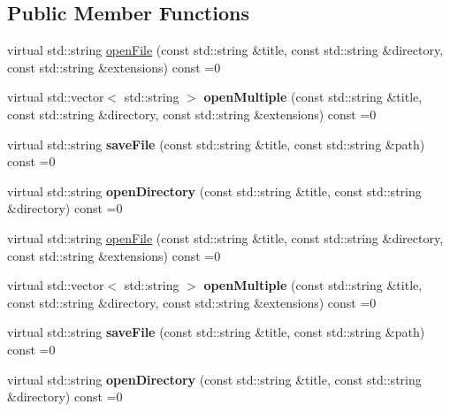 \subsection*{Public Member Functions}
\begin{DoxyCompactItemize}
\item 
virtual std\+::string \hyperlink{classPlayerFileDialogServiceProtocol_ac9ef6f506a2ad68bcec05a0029b5cf83}{open\+File} (const std\+::string \&title, const std\+::string \&directory, const std\+::string \&extensions) const =0
\item 
\mbox{\label{classPlayerFileDialogServiceProtocol_a2960d04838f5ad40b465ec4fda7111ce}} 
virtual std\+::vector$<$ std\+::string $>$ {\bfseries open\+Multiple} (const std\+::string \&title, const std\+::string \&directory, const std\+::string \&extensions) const =0
\item 
\mbox{\label{classPlayerFileDialogServiceProtocol_a3197bc1e187cc780c0c582b09c6d7fc3}} 
virtual std\+::string {\bfseries save\+File} (const std\+::string \&title, const std\+::string \&path) const =0
\item 
\mbox{\label{classPlayerFileDialogServiceProtocol_a65fa8168857503f0d6d6bd545d741e40}} 
virtual std\+::string {\bfseries open\+Directory} (const std\+::string \&title, const std\+::string \&directory) const =0
\item 
virtual std\+::string \hyperlink{classPlayerFileDialogServiceProtocol_ac9ef6f506a2ad68bcec05a0029b5cf83}{open\+File} (const std\+::string \&title, const std\+::string \&directory, const std\+::string \&extensions) const =0
\item 
\mbox{\label{classPlayerFileDialogServiceProtocol_a2960d04838f5ad40b465ec4fda7111ce}} 
virtual std\+::vector$<$ std\+::string $>$ {\bfseries open\+Multiple} (const std\+::string \&title, const std\+::string \&directory, const std\+::string \&extensions) const =0
\item 
\mbox{\label{classPlayerFileDialogServiceProtocol_a3197bc1e187cc780c0c582b09c6d7fc3}} 
virtual std\+::string {\bfseries save\+File} (const std\+::string \&title, const std\+::string \&path) const =0
\item 
\mbox{\label{classPlayerFileDialogServiceProtocol_a65fa8168857503f0d6d6bd545d741e40}} 
virtual std\+::string {\bfseries open\+Directory} (const std\+::string \&title, const std\+::string \&directory) const =0
\end{DoxyCompactItemize}


